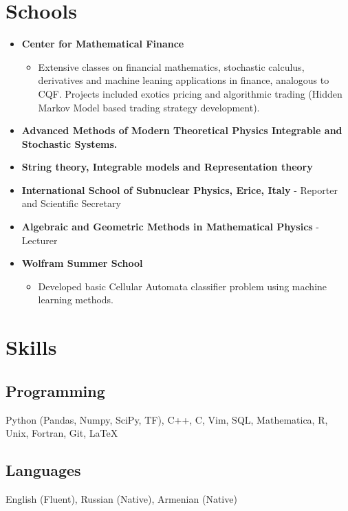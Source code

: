 \documentclass{article}
\begin{document}
\section{Schools}
\begin{itemize}
	\item \textbf{Center for Mathematical Finance}
	\begin{itemize}
		\item Extensive classes on financial mathematics, stochastic calculus, derivatives and machine leaning applications in finance, analogous to CQF. Projects included exotics pricing and algorithmic trading (Hidden Markov Model based trading strategy development). 
		
	\end{itemize}

	\item \textbf{Advanced Methods of Modern Theoretical Physics Integrable and Stochastic Systems.}
	\item \textbf{String theory, Integrable models and Representation theory}
	\item \textbf{International School of Subnuclear Physics, Erice, Italy} - Reporter and Scientific Secretary
	\item \textbf{Algebraic and Geometric Methods in Mathematical Physics} - Lecturer
	
	\item \textbf{Wolfram Summer School}
	
	
	
	\begin{itemize}
		\item Developed basic Cellular Automata classifier problem using machine learning methods.
		
	\end{itemize}
	
\end{itemize}









\section{Skills}
\subsection{Programming}
Python (Pandas, Numpy, SciPy, TF), C++, C, Vim, SQL, Mathematica, R, Unix, Fortran, Git, \LaTeX
\subsection{Languages}
English (Fluent), Russian (Native), Armenian (Native)
\end{document}
